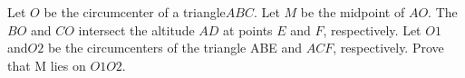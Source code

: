Let $O$ be the circumcenter of a triangle$ ABC$. Let $M$ be the midpoint of $AO$. The $BO$ and $CO$ intersect the altitude $AD$ at points $E$ and $F$, respectively. Let $O1$ and$ O2$ be the circumcenters of the triangle ABE and $ACF$,  respectively. Prove that M lies on $O1O2$.